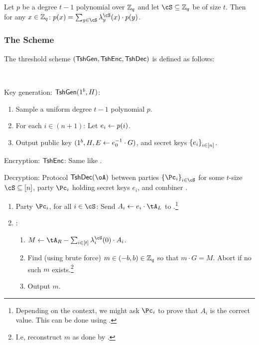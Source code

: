 \begin{fact}
	Let $p$ be a  degree $t-1$ polynomial over ${\mathbb Z}_q$ and let $\cS \subseteq \Z_q$  be of size $t$.  Then for  any $x\in {\mathbb Z}_q$: $p(x) = \sum_{y \in \cS}   \lambda_y^\cS(x) \cdot p(y)$.
\end{fact}

\subsubsection{The Scheme}
The threshold scheme  $(\mathsf{TshGen},\mathsf{TshEnc},\mathsf{TshDec})$ is defined as follows:


\begin{algorithm}\label{alg:TDH2}~
	
	\item[Key generation:] $\mathsf{TshGen}(1^b,H)$:
	\begin{enumerate}
		\item Sample  a uniform degree $t-1$ polynomial  $p$. 
		
		\item For each $i\in (n+1)$: Let $e_i \leftarrow p(i)$.
		
		 
		
		 \item Output public key $(1^b,H,E \leftarrow e_0^{-1} \cdot G)$, and secret keys $\set{e_i}_{i\in [n]}$.
	\end{enumerate}
	

	
	\item[Encryption:]  $\mathsf{TshEnc}$:  Same like \EgEnc.
	
	
	
	\item[Decryption:] Protocol $\tdDec(\oA)$ between parties  $\set{\Pc_i}_{i\in \cS}$ for some $t$-size $\cS \subseteq [n]$, party $\Pc_i$ holding secret keys $e_i$, and combiner \Cc.
	
	\begin{enumerate}
		\item Party $\Pc_i$, for all $i\in \cS$:  Send   $A_i \asn e_i \cdot \tA_L$ to \Cc.\footnote{Depending on the context, we might ask $\Pc_i$ to prove that $A_i$ is  the correct value. This can be  done using   \piZKPOK{\rEgConsSk}.}
		
		
		\item  \Cc: 
		\begin{enumerate}
			\item $M \asn \tA_R - \sum_{i\in [t]}   \lambda_i^\cS(0) \cdot A_i$.
			
			\item Find (using brute force) $m\in (-b, b) \in {\mathbb Z}_q$ so that $m\cdot G = M$. Abort if no such $m$ exists.\footnote{I.e, \Cc reconstruct $m$ as done by  \EgDec.}
			
			\item Output $m$.
		\end{enumerate}
	\end{enumerate}
\end{algorithm}	


